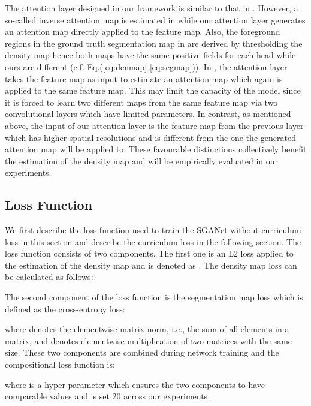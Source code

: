 \documentclass[journal,comsoc]{IEEEtran}
\begin{document}
The attention layer designed in our framework is similar to that in \cite{sindagi2019inverse,shi2019counting}. However, a so-called inverse attention map is estimated in \cite{sindagi2019inverse} while our attention layer generates an attention map directly applied to the feature map. Also, the foreground regions in the ground truth segmentation map in \cite{sindagi2019inverse} are derived by thresholding the density map hence both maps have the same positive fields for each head while ours are different (c.f. Eq.(\ref{eq:denmap}-\ref{eq:segmap})). In \cite{shi2019counting}, the attention layer takes the feature map as input to estimate an attention map which again is applied to the same feature map. This may limit the capacity of the model since it is forced to learn two different maps from the same feature map via two convolutional layers which have limited parameters. In contrast, as mentioned above, the input of our attention layer is the feature map from the previous layer which has higher spatial resolutions and is different from the one the generated attention map will be applied to. These favourable distinctions collectively benefit the estimation of the density map and will be empirically evaluated in our experiments.

\subsection{Loss Function} \label{sec:loss}
We first describe the loss function used to train the SGANet without curriculum loss in this section and describe the curriculum loss in the following section. The loss function consists of two components. The first one is an L2 loss applied to the estimation of the density map and is denoted as . The density map loss can be calculated as follows:

The second component of the loss function is the segmentation map loss  which is defined as the cross-entropy loss:

where  denotes the elementwise matrix norm, i.e., the sum of all elements in a matrix, and  denotes elementwise multiplication of two matrices with the same size.
These two components are combined during network training and the compositional loss function is:

where  is a hyper-parameter which ensures the two components to have comparable values and is set 20 across our experiments.
\end{document}
